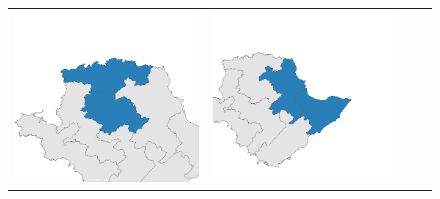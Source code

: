 \begin{figure}[p]
\begin{tabularx}{1\textwidth}{XXXX}
\includegraphics[width=1\linewidth]{images/ch6/mergefocus/18}&
\includegraphics[width=1\linewidth]{images/ch6/mergefocus/19} \\

\end{tabularx}
\end{figure}
